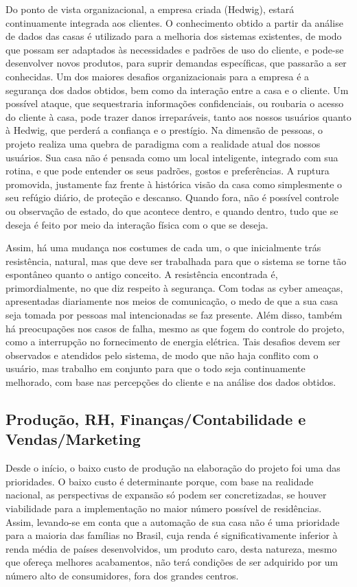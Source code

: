 Do ponto de vista organizacional, a empresa criada (Hedwig), estará continuamente integrada aos clientes. O conhecimento obtido a partir da análise de dados das casas é utilizado para a melhoria dos sistemas existentes, de modo que possam ser adaptados às necessidades e padrões de uso do cliente, e pode-se desenvolver novos produtos, para suprir demandas específicas, que passarão a ser conhecidas. Um dos maiores desafios organizacionais para a empresa é a segurança dos dados obtidos, bem como da interação entre a casa e o cliente. Um possível ataque, que sequestraria informações confidenciais, ou roubaria o acesso do cliente à casa, pode trazer danos irreparáveis, tanto aos nossos usuários quanto à Hedwig, que perderá a confiança e o prestígio.
Na dimensão de pessoas, o projeto realiza uma quebra de paradigma com a realidade atual dos nossos usuários. Sua casa não é pensada como um local inteligente, integrado com sua rotina, e que pode entender os seus padrões, gostos e preferências. A ruptura promovida, justamente faz frente à histórica visão da casa como simplesmente o seu refúgio diário, de proteção e descanso. Quando fora, não é possível controle ou observação de estado, do que acontece dentro, e quando dentro, tudo que se deseja é feito por meio da interação física com o que se deseja.

Assim, há uma mudança nos costumes de cada um, o que inicialmente trás resistência, natural, mas que deve ser trabalhada para que o sistema se torne tão espontâneo quanto o antigo conceito. A resistência encontrada é, primordialmente, no que diz respeito à segurança. Com todas as cyber ameaças, apresentadas diariamente nos meios de comunicação, o medo de que a sua casa seja tomada por pessoas mal intencionadas se faz presente. Além disso, também há preocupações nos casos de falha, mesmo as que fogem do controle do projeto, como a interrupção no fornecimento de energia elétrica.
Tais desafios devem ser observados e atendidos pelo sistema, de modo que não haja conflito com o usuário, mas trabalho em conjunto para que o todo seja continuamente melhorado, com base nas percepções do cliente e na análise dos dados obtidos.


\subsection{Produção, RH, Finanças/Contabilidade e Vendas/Marketing}

Desde o início, o baixo custo de produção na elaboração do projeto foi uma das prioridades. O baixo custo é determinante porque, com base na realidade nacional, as perspectivas de expansão só podem ser concretizadas, se houver viabilidade para a implementação no maior número possível de residências. Assim, levando-se em conta que a automação de sua casa não é uma prioridade para a maioria das famílias no Brasil, cuja renda é significativamente inferior à renda média de países desenvolvidos, um produto caro, desta natureza, mesmo que ofereça melhores acabamentos, não terá condições de ser adquirido por um número alto de consumidores, fora dos grandes centros.

